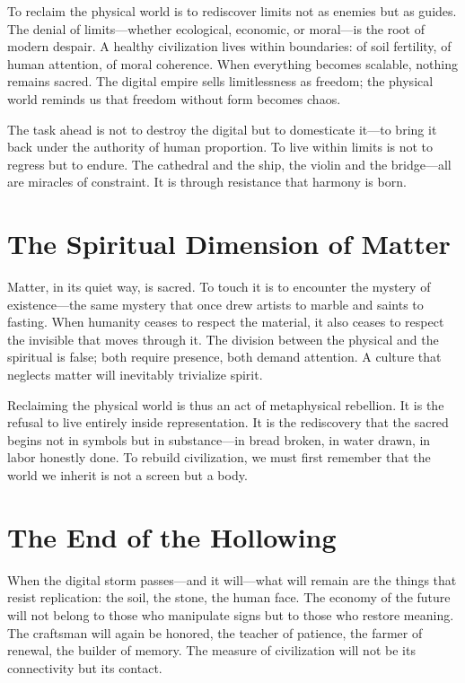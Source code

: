 \documentclass[11pt,twoside]{book}
\begin{document}
To reclaim the physical world is to rediscover limits not as enemies but as guides.  
The denial of limits—whether ecological, economic, or moral—is the root of modern despair.  
A healthy civilization lives within boundaries: of soil fertility, of human attention, of moral coherence.  
When everything becomes scalable, nothing remains sacred.  
The digital empire sells limitlessness as freedom; the physical world reminds us that freedom without form becomes chaos.

The task ahead is not to destroy the digital but to domesticate it—to bring it back under the authority of human proportion.  
To live within limits is not to regress but to endure.  
The cathedral and the ship, the violin and the bridge—all are miracles of constraint.  
It is through resistance that harmony is born.

\section*{The Spiritual Dimension of Matter}

Matter, in its quiet way, is sacred.  
To touch it is to encounter the mystery of existence—the same mystery that once drew artists to marble and saints to fasting.  
When humanity ceases to respect the material, it also ceases to respect the invisible that moves through it.  
The division between the physical and the spiritual is false; both require presence, both demand attention.  
A culture that neglects matter will inevitably trivialize spirit.

Reclaiming the physical world is thus an act of metaphysical rebellion.  
It is the refusal to live entirely inside representation.  
It is the rediscovery that the sacred begins not in symbols but in substance—in bread broken, in water drawn, in labor honestly done.  
To rebuild civilization, we must first remember that the world we inherit is not a screen but a body.

\section*{The End of the Hollowing}

When the digital storm passes—and it will—what will remain are the things that resist replication: the soil, the stone, the human face.  
The economy of the future will not belong to those who manipulate signs but to those who restore meaning.  
The craftsman will again be honored, the teacher of patience, the farmer of renewal, the builder of memory.  
The measure of civilization will not be its connectivity but its contact.
\end{document}
